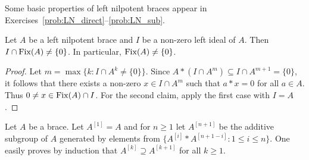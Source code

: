 Some basic properties of left nilpotent braces appear in Exercises~\ref{prob:LN_direct}--\ref{prob:LN_sub}. 

    
\begin{proposition}
    \label{pro:IcapFix}
    Let $A$ be a left nilpotent brace and $I$ be a non-zero left ideal of
    $A$. Then $I\cap\operatorname{Fix}(A)\ne\{0\}$. In particular, $\operatorname{Fix}(A)\ne\{0\}$. 
\end{proposition}

\begin{proof}
    Let $m=\max\{k:I\cap A^k\ne\{0\}\}$. Since
    $A*(I\cap A^m)\subseteq I\cap A^{m+1}=\{0\}$,
    it follows that there exists a non-zero $x\in I\cap A^m$ such that $a*x=0$
    for all $a\in A$. Thus $0\ne x\in\operatorname{Fix}(A)\cap I$.
    For the second claim, apply the first case with $I=A$.
\end{proof}

Let $A$ be a brace.
Let $A^{[1]}=A$ and for $n\geq 1$ let $A^{[n+1]}$ be the
additive subgroup of $A$ generated by elements from
$\{A^{[i]}*A^{[n+1-i]}:1\leq i\leq n\}$.
One easily proves by induction that $A^{[k]}\supseteq
A^{[k+1]}$ for all $k\geq1$. 


